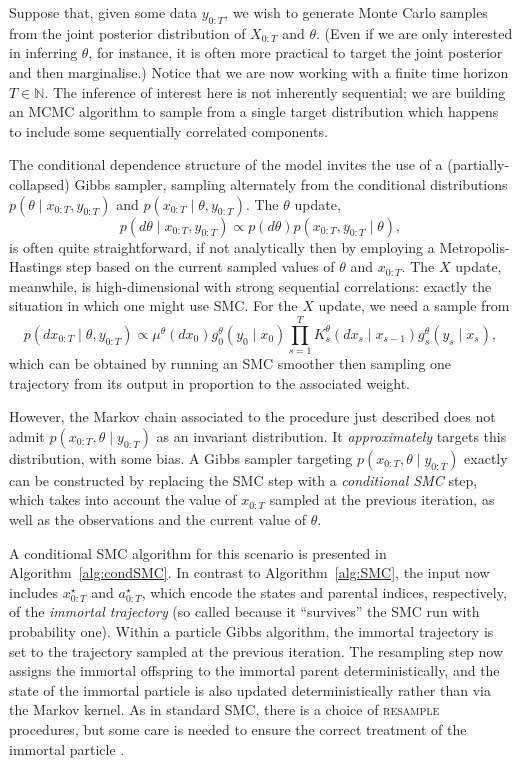 Suppose that, given some data $y_{0:T}$, we wish to generate Monte Carlo samples from the joint posterior distribution of $X_{0:T}$ and $\theta$. (Even if we are only interested in inferring $\theta$, for instance, it is often more practical to target the joint posterior and then marginalise.)
Notice that we are now working with a finite time horizon $T\in\mathbb{N}$. The inference of interest here is not inherently sequential; we are building an MCMC algorithm to sample from a single target distribution which happens to include some sequentially correlated components.


The conditional dependence structure of the model invites the use of a (partially-collapsed) Gibbs sampler, sampling alternately from the conditional distributions $p(\theta \mid x_{0:T}, y_{0:T})$ and $p(x_{0:T} \mid \theta, y_{0:T})$.
The $\theta$ update,
\begin{equation*}
p(d\theta \mid x_{0:T}, y_{0:T}) \propto p(d\theta) p(x_{0:T}, y_{0:T} \mid \theta) ,
\end{equation*}
is often quite straightforward, if not analytically then by employing a Metropolis-Hastings step based on the current sampled values of $\theta$ and $x_{0:T}$. 
The $X$ update, meanwhile, is high-dimensional with strong sequential correlations: exactly the situation in which one might use SMC. 
For the $X$ update, we need a sample from
\begin{equation}\label{eq:PG_Xposterior}
p(dx_{0:T} \mid \theta, y_{0:T}) 
\propto \mu^\theta(dx_0) g_0^\theta(y_0\mid x_0) \prod_{s=1}^T K_s^\theta(dx_s \mid x_{s-1}) g_s^\theta(y_s \mid x_s) ,
\end{equation}
which can be obtained by running an SMC smoother then sampling one trajectory from its output in proportion to the associated weight.

However, the Markov chain associated to the procedure just described does not admit $p(x_{0:T},\theta \mid y_{0:T})$ as an invariant distribution. It \emph{approximately} targets this distribution, with some bias.
A Gibbs sampler targeting $p(x_{0:T},\theta \mid y_{0:T})$ exactly can be constructed by replacing the SMC step with a \emph{conditional SMC} step, which takes into account the value of $x_{0:T}$ sampled at the previous iteration, as well as the observations and the current value of $\theta$.

A conditional SMC algorithm for this scenario is presented in Algorithm~\ref{alg:condSMC}.
In contrast to Algorithm~\ref{alg:SMC}, the input now includes $x_{0:T}^\star$ and $a_{0:T}^\star$, which encode the states and parental indices, respectively, of the \emph{immortal trajectory} (so called because it ``survives'' the SMC run with probability one). Within a particle Gibbs algorithm, the immortal trajectory is set to the trajectory sampled at the previous iteration.
The resampling step now assigns the immortal offspring to the immortal parent deterministically, and the state of the immortal particle is also updated deterministically rather than via the Markov kernel.
As in standard SMC, there is a choice of \textsc{resample} procedures, but some care is needed to ensure the correct treatment of the immortal particle \parencite{lee2019}.

